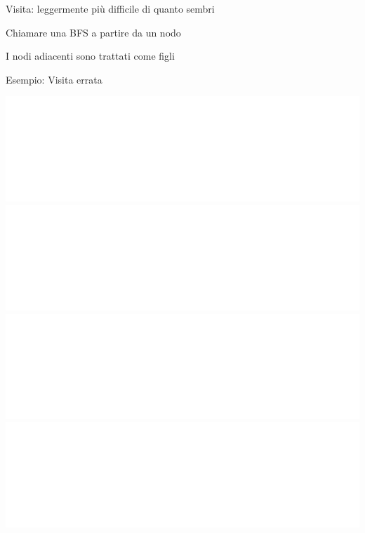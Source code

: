 \begin{frame}{Visita: leggermente più difficile di quanto sembri}

\BI
\item Chiamare una BFS a partire da un nodo
\item I nodi adiacenti sono trattati come figli
\EI

\end{frame}



\begin{frame}{Esempio: Visita errata}

\vspace{-18pt}
\begin{center}
\begin{overprint}
\includegraphics<1|handout:0>[width=1.0\textwidth,page=1]{errata.pdf}
\includegraphics<2|handout:0>[width=1.0\textwidth,page=2]{errata.pdf}
\includegraphics<3|handout:0>[width=1.0\textwidth,page=3]{errata.pdf}
\includegraphics<4|handout:1>[width=1.0\textwidth,page=4]{errata.pdf}
\end{overprint}
\end{center}

\end{frame}

